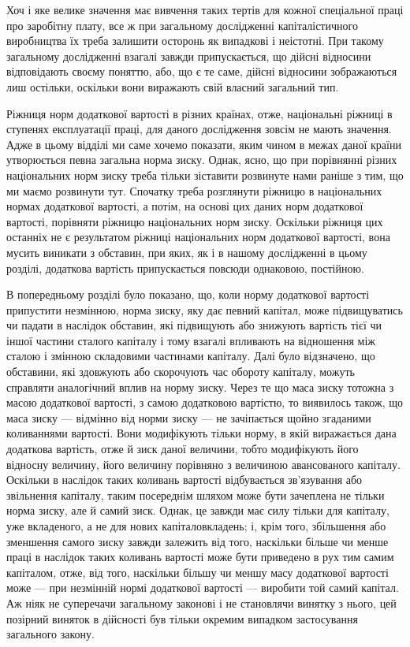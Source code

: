 \parcont{}  %
Хоч і яке велике значення має вивчення таких тертів для кожної
спеціальної праці про заробітну плату, все ж при загальному
дослідженні капіталістичного виробництва їх треба залишити
осторонь як випадкові і неістотні. При такому загальному
дослідженні взагалі завжди припускається, що дійсні відносини
відповідають своєму поняттю, або, що є те саме, дійсні відносини
зображаються лиш остільки, оскільки вони виражають свій
власний загальний тип.

Ріжниця норм додаткової вартості в різних країнах, отже,
національні ріжниці в ступенях експлуатації праці, для даного
дослідження зовсім не мають значення. Адже в цьому відділі ми
саме хочемо показати, яким чином в межах даної країни утворюється
певна загальна норма зиску. Однак, ясно, що при порівнянні
різних національних норм зиску треба тільки зіставити розвинуте
нами раніше з тим, що ми маємо розвинути тут. Спочатку
треба розглянути ріжницю в національних нормах додаткової
вартості, а потім, на основі цих даних норм додаткової вартості,
порівняти ріжницю національних норм зиску. Оскільки ріжниця
цих останніх не є результатом ріжниці національних норм додаткової
вартості, вона мусить виникати з обставин, при яких,
як і в нашому дослідженні в цьому розділі, додаткова вартість
припускається повсюди однаковою, постійною.

В попередньому розділі було показано, що, коли норму додаткової
вартості припустити незмінною, норма зиску, яку дає певний
капітал, може підвищуватись чи падати в наслідок обставин,
які підвищують або знижують вартість тієї чи іншої частини
сталого капіталу і тому взагалі впливають на відношення між
сталою і змінною складовими частинами капіталу. Далі було
відзначено, що обставини, які здовжують або скорочують час
обороту капіталу, можуть справляти аналогічний вплив на
норму зиску. Через те що маса зиску тотожна з масою додаткової
вартості, з самою додатковою вартістю, то виявилось також,
що маса зиску — відмінно від норми зиску — не зачіпається
щойно згаданими коливаннями вартості. Вони модифікують тільки
норму, в якій виражається дана додаткова вартість, отже й зиск
даної величини, тобто модифікують його відносну величину,
його величину порівняно з величиною авансованого капіталу.
Оскільки в наслідок таких коливань вартості відбувається зв’язування
або звільнення капіталу, таким посереднім шляхом може
бути зачеплена не тільки норма зиску, але й самий зиск. Однак,
це завжди має силу тільки для капіталу, уже вкладеного, а не
для нових капіталовкладень; і, крім того, збільшення або зменшення
самого зиску завжди залежить від того, наскільки більше
чи менше праці в наслідок таких коливань вартості може бути
приведено в рух тим самим капіталом, отже, від того, наскільки
більшу чи меншу масу додаткової вартості може — при незмінній
нормі додаткової вартості — виробити той самий капітал.
Аж ніяк не суперечачи загальному законові і не становлячи винятку
з нього, цей позірний виняток в дійсності був тільки
окремим випадком застосування загального закону.

